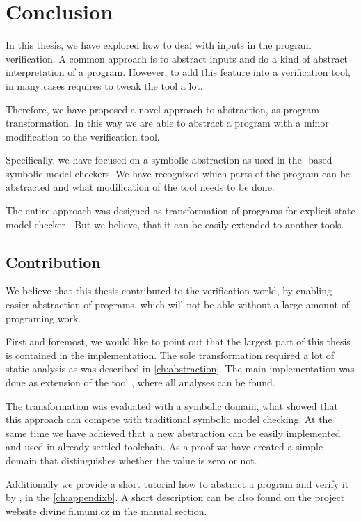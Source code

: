 \chapter{Conclusion}\label{ch:conclusion}

In this thesis, we have explored how to deal with inputs in the program
verification. A common approach is to abstract inputs and do a kind of abstract
interpretation of a program. However, to add this feature into a verification
tool, in many cases requires to tweak the tool a lot.

Therefore, we have proposed a novel approach to abstraction, as program
transformation. In this way we are able to abstract a program with a minor
modification to the verification tool.

Specifically, we have focused on a symbolic abstraction as used in the \SMT-based
symbolic model checkers. We have recognized which parts of the program can be
abstracted and what modification of the tool needs to be done.

The entire approach was designed as transformation of \LLVM programs for
explicit-state model checker \DIVINE. But we believe, that it can be easily extended
to another tools.

\section{Contribution}
We believe that this thesis contributed to the verification world, by enabling
easier abstraction of programs, which will not be able without a large amount of
programing work.

First and foremost, we would like to point out that the largest part of this
thesis is contained in the implementation. The sole transformation required
a lot of static analysis as was described in \autoref{ch:abstraction}. The main
implementation was done as extension of the tool \LART, where all analyses can be
found.

The transformation was evaluated with a symbolic domain,
what showed that this approach can compete with traditional symbolic model
checking.  At the same time we have achieved that a new abstraction can be
easily implemented and used in already settled \DIVINE toolchain. As a proof
we have created a simple domain that distinguishes whether the value is zero
or not.

Additionally we provide a short tutorial how to abstract a program and verify it by
\DIVINE, in the \autoref{ch:appendixb}. A short description can be also found on
the project website \url{divine.fi.muni.cz} in the manual section.

